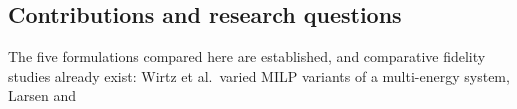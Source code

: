 \documentclass[a4paper,fleqn]{cas-dc}
\begin{document}
\subsection{Contributions and research questions}
The five formulations compared here are established, and comparative fidelity studies
already exist: Wirtz et al.\ varied MILP variants of a multi-energy system, Larsen and
\end{document}
